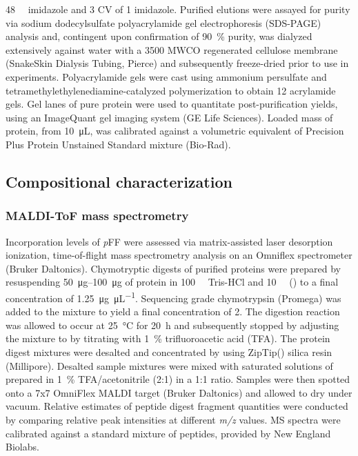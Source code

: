 \begin{refsection}
\SI{48}{\milli\moLar} imidazole and 3 CV of \SI{1}{\moLar} imidazole.  Purified
elutions were assayed for purity via sodium dodecylsulfate polyacrylamide gel
electrophoresis (SDS-PAGE) analysis and, contingent upon confirmation of
\SI{90}{\percent} purity, was dialyzed extensively against water with a 3500
MWCO regenerated cellulose membrane (SnakeSkin Dialysis Tubing, Pierce) and
subsequently freeze-dried prior to use in experiments. Polyacrylamide gels were
cast using ammonium persulfate and tetramethylethylenediamine-catalyzed
polymerization to obtain \SI{12}{\wtper} acrylamide gels. Gel lanes of pure
protein were used to quantitate post-purification yields, using an ImageQuant
gel imaging system (GE Life Sciences). Loaded mass of protein, from
\SI{10}{\uL}, was calibrated against a volumetric equivalent of Precision Plus
Protein Unstained Standard mixture (Bio-Rad).

\subsection{Compositional characterization}
\subsubsection{MALDI-ToF mass spectrometry}

Incorporation levels of \emph{p}FF were assessed via matrix-assisted laser desorption
ionization, time-of-flight mass spectrometry analysis on an Omniflex
spectrometer (Bruker Daltonics). Chymotryptic digests of purified proteins were
prepared by resuspending \SIrange[range-phrase=--]{50}{100}{\ug} of protein in
\SI{100}{\milli\moLar} Tris-HCl and \SI{10}{\milli\moLar}  ()
to a final concentration of \SI{1.25}{\ug\per\uL}. Sequencing grade chymotrypsin
(Promega) was added to the mixture to yield a final concentration of
\SI{2}{\wtperwt}. The digestion reaction was allowed to occur at \SI{25}{\celsius}
for \SI{20}{\hour} and subsequently stopped by adjusting the mixture to  by
titrating with \SI{1}{\percent} trifluoroacetic acid (TFA). The protein digest
mixtures were desalted and concentrated by using ZipTip() silica resin
(Millipore).  Desalted sample mixtures were mixed with saturated solutions of
 prepared in \SI{1}{\percent}
TFA/acetonitrile (2:1) in a 1:1 ratio. Samples were then spotted onto a 7x7
OmniFlex MALDI target (Bruker Daltonics) and allowed to dry under vacuum.
Relative estimates of peptide digest fragment quantities were conducted by
comparing relative peak intensities at different \emph{m/z} values. MS spectra
were calibrated against a standard mixture of peptides, provided by New England
Biolabs.


\end{refsection}

